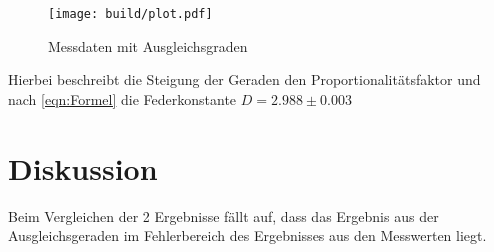 \documentclass[titlepage = firstcover]{scrartcl}
\begin{document}
\begin{figure}[h]
  \centering
  \texttt{[image: build/plot.pdf]}
  \caption{Messdaten mit Ausgleichsgraden}
  \label{fig:Plot}
\end{figure}

Hierbei beschreibt die Steigung der Geraden den Proportionalitätsfaktor und
nach \eqref{eqn:Formel} die Federkonstante $D=2.988 \pm 0.003$

\newpage
\section{Diskussion}
\label{sec:Diskussion}
Beim Vergleichen der 2 Ergebnisse fällt auf,
dass das Ergebnis aus der Ausgleichsgeraden im Fehlerbereich des Ergebnisses aus den Messwerten liegt.

































\begin{figure}
  \begin{floatrow}
\end{floatrow}
\end{figure}
\end{document}
